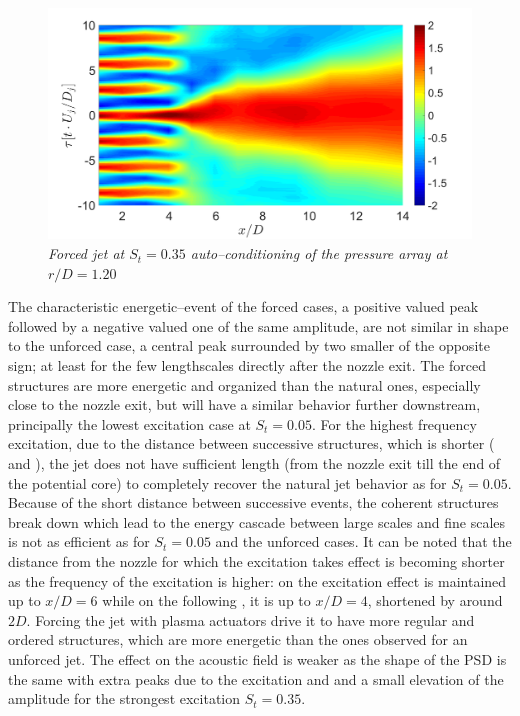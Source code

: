 \begin{figure}
	\centering
	\includegraphics[width=1\textwidth]{Figures/conditioning/autoCondSt0p35.png}
	\caption{\textit{Forced jet at $S_t = 0.35$ auto--conditioning of the pressure array at $r/D = 1.20$}}
	\label{fig:autoCondSt0p35}
\end{figure}
The characteristic energetic--event of the forced cases, a positive valued peak followed by a negative valued one of the same amplitude, are not similar in shape to the unforced case, a central peak surrounded by two smaller of the opposite sign; at least for the few lengthscales directly after the nozzle exit. The forced structures are more energetic and organized than the natural ones, especially close to the nozzle exit, but will have a similar behavior further downstream, principally the lowest excitation case at $S_t = 0.05$. For the highest frequency excitation, due to the distance between successive structures, which is shorter ( and ), the jet does not have sufficient length (from the nozzle exit till the end of the potential core) to completely recover the natural jet behavior as for $S_t = 0.05$. Because of the short distance between successive events, the coherent structures break down which lead to the energy cascade between large scales and fine scales is not as efficient as for $S_t = 0.05$ and the unforced cases. It can be noted that the distance from the nozzle for which the excitation takes effect is becoming shorter as the frequency of the excitation is higher: on  the excitation effect is maintained up to $x/D=6$ while on the following , it is up to $x/D=4$, shortened by around $2D$.
Forcing the jet with plasma actuators drive it to have more regular and ordered structures, which are more energetic than the ones observed for an unforced jet. The effect on the acoustic field is weaker as the shape of the PSD is the same  with extra peaks due to the excitation and and a small elevation of the amplitude for the strongest excitation $S_t = 0.35$.

